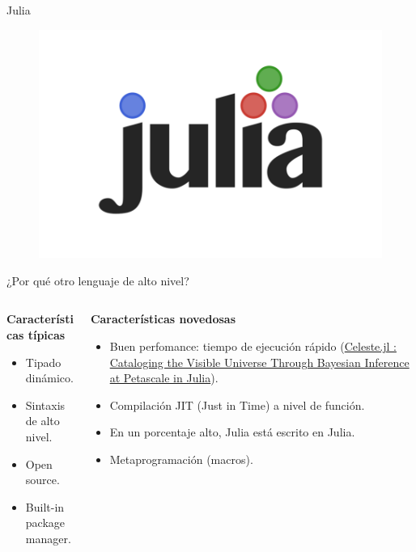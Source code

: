 \documentclass[11pt]{beamer}
\begin{document}
\begin{frame}{Julia}
	\begin{figure}
		\includegraphics[scale=0.3]{images/julia}
	\end{figure}
\end{frame}


\begin{frame}{¿Por qué otro lenguaje de alto nivel?}


\begin{columns}
\begin{column}{0.5\textwidth}
	{\center \textbf{Características típicas}}
	
	\begin{itemize}
		\item Tipado dinámico. 
		\item Sintaxis de alto nivel.
		\item Open source.
		\item Built-in package manager.
	\end{itemize}
\end{column}
\begin{column}{0.5\textwidth}  %
	{\center \textbf{Características novedosas}}
	\begin{itemize}
		\item Buen perfomance: tiempo de ejecución rápido (\href{https://www.youtube.com/watch?v=uecdcADM3hY&t=205s}{\scriptsize Celeste.jl : Cataloging the Visible Universe Through Bayesian Inference at Petascale in Julia}). 
		\item Compilación JIT (Just in Time) a nivel de función.
		\item En un porcentaje alto, Julia está escrito en Julia. 
		\item Metaprogramación (macros).
	\end{itemize}
\end{column}
\end{columns}

\end{frame}
\end{document}
